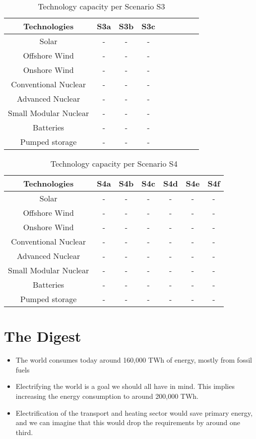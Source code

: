 \begin{table}[ht]
\caption[Technology capacity per Scenario S3]{Technology capacity per Scenario S3}
\begin{tabular}{ c c c c c c c c c }
	\toprule
	Technologies & S3a & S3b & S3c \\
	\midrule
	Solar & - & - & -  \\
	Offshore Wind & - & - & -  \\
	Onshore Wind & - & - & -  \\
	Conventional Nuclear & - & - & -  \\
	Advanced Nuclear & - & - & -  \\
	Small Modular Nuclear & - & - & -  \\
	Batteries & - & - & -  \\
	Pumped storage & - & - & -  \\
	\bottomrule
\end{tabular}
\end{table}

\begin{table}[ht]
\caption[Technology capacity per Scenario S4]{Technology capacity per Scenario S4}
\begin{tabular}{ c c c c c c c }
	\toprule
	Technologies & S4a & S4b & S4c & S4d & S4e & S4f \\
	\midrule
	Solar & - & - & - & - & - & - \\
	Offshore Wind & - & - & - & - & - & - \\
	Onshore Wind & - & - & - & - & - & - \\
	Conventional Nuclear & - & - & - & - & - & - \\
	Advanced Nuclear & - & - & - & - & - & - \\
	Small Modular Nuclear & - & - & - & - & - & - \\
	Batteries & - & - & - & - & - & - \\
	Pumped storage & - & - & - & - & - & - \\
	\bottomrule
\end{tabular}
\end{table}

\section{The Digest}


\begin{kaoboxgreen}[frametitle=Main Takeaways]

\begin{itemize}
\item The world consumes today around 160,000 TWh of energy, mostly from fossil fuels
\item Electrifying the world is a goal we should all have in mind. This implies increasing the energy consumption to around 200,000 TWh.
\item Electrification of the transport and heating sector would save primary energy, and we can imagine that this would drop the requirements by around one third.
\end{itemize}
  
\end{kaoboxgreen}